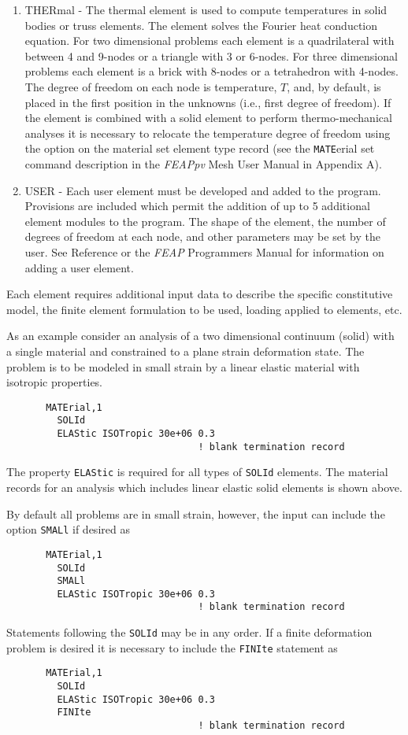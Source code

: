 \begin{enumerate}
\item
THERmal -  The thermal element is used to compute temperatures in solid
bodies or truss elements.  The element solves the Fourier heat conduction
equation.
For two dimensional problems each element is a quadrilateral
with between 4 and 9-nodes or a triangle with 3 or 6-nodes.
For three dimensional problems each element
is a brick with 8-nodes or a tetrahedron with 4-nodes.
The degree of freedom on each node is temperature, $T$, and, by default,
is placed in the first position in the unknowns (i.e., first degree of freedom).
If the element is combined with a solid element to perform thermo-mechanical
analyses it is necessary to relocate the temperature degree of freedom using
the option on the material set element type record (see the \texttt{MATE}erial
set command description in the {\sl FEAPpv} Mesh User Manual in Appendix A).

\item
USER -  Each user element must be developed and added to the program.
Provisions are included which permit the addition of up to 5 additional
element modules to the program.
The shape of the element, the number of degrees of freedom at each node,
and other parameters may be set by the user.  See Reference \cite{zt1n}
or the {\sl FEAP} Programmers Manual for information on adding
a user element.
\end{enumerate}

Each element requires additional input data to describe the
specific constitutive model, the finite element formulation to be used,
loading applied to elements, etc.

As an example consider an analysis of a two dimensional
continuum (solid) with a single material and constrained to a plane strain
deformation state.  The problem is to be modeled in small strain
by a linear elastic material with isotropic properties.
\begin{verbatim}
       MATErial,1
         SOLId
         ELAStic ISOTropic 30e+06 0.3
                                  ! blank termination record
\end{verbatim}
The property \texttt{ELAStic} is required for all types of \texttt{SOLId}
elements.  The material records for an
analysis which includes linear elastic solid elements is shown above.

By default all problems are in small strain, however, the input can include
the option \texttt{SMALl} if desired as
\begin{verbatim}
       MATErial,1
         SOLId
         SMALl
         ELAStic ISOTropic 30e+06 0.3
                                  ! blank termination record
\end{verbatim}
Statements following the \texttt{SOLId} may be in any order.  If a finite
deformation problem is desired it is necessary to include the \texttt{FINIte}
statement as 
\begin{verbatim}
       MATErial,1
         SOLId
         ELAStic ISOTropic 30e+06 0.3
         FINIte
                                  ! blank termination record
\end{verbatim}

